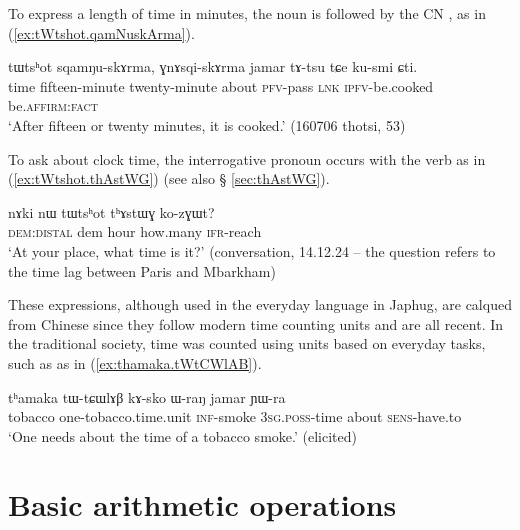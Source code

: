 {To express a length of time in minutes, the noun    is followed by the CN , as in (\ref{ex:tWtshot.qamNuskArma}).
  
 \begin{exe}
\ex \label{ex:tWtshot.qamNuskArma}
 \gll  tɯtsʰot sqamŋu-skɤrma, ɣnɤsqi-skɤrma jamar tɤ-tsu tɕe ku-smi ɕti. \\
 time fifteen-minute twenty-minute about \textsc{pfv}-pass \textsc{lnk} \textsc{ipfv}-be.cooked be.\textsc{affirm}:\textsc{fact} \\
 \glt `After fifteen or twenty minutes, it is cooked.' (160706 thotsi, 53)
   \end{exe}

To ask about clock time, the interrogative pronoun  occurs with the verb  as in (\ref{ex:tWtshot.thAstWG}) (see also § \ref{sec:thAstWG}).

  \begin{exe}
\ex \label{ex:tWtshot.thAstWG}
 \gll     nɤki nɯ tɯtsʰot tʰɤstɯɣ ko-zɣɯt? \\
 \textsc{dem}:\textsc{distal} dem hour how.many \textsc{ifr}-reach \\
 \glt  `At your place, what time is it?' (conversation, 14.12.24 -- the question refers to the time lag between Paris and Mbarkham)
    \end{exe}
    
 These expressions, although used in the everyday language in Japhug, are calqued from Chinese since they follow modern time counting units and are all recent. In the traditional society, time was counted using units based on everyday tasks, such as  as in  (\ref{ex:thamaka.tWtCWlAB}).
 
   \begin{exe}
\ex \label{ex:thamaka.tWtCWlAB}
 \gll    tʰamaka tɯ-tɕɯlɤβ kɤ-sko ɯ-raŋ jamar ɲɯ-ra \\
tobacco  one-tobacco.time.unit \textsc{inf}-smoke \textsc{3sg}.\textsc{poss}-time about \textsc{sens}-have.to \\
\glt `One needs about the time of a tobacco smoke.' (elicited)
 \end{exe}
    
\section{Basic arithmetic operations} \label{sec:arithmetic}

}
